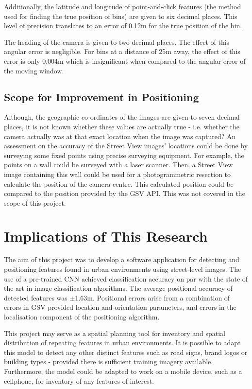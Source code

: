 Additionally, the latitude and longitude of point-and-click features (the method used for finding the true position of bins) are given to six decimal places. This level of precision translates to an error of 0.12m for the true position of the bin.

The heading of the camera is given to two decimal places. The effect of this angular error is negligible. For bins at a distance of 25m away, the effect of this error is only 0.004m which is insignificant when compared to the angular error of the moving window.

\subsection{Scope for Improvement in Positioning}
Although, the geographic co-ordinates of the images are given to seven decimal places, it is not known whether these values are actually true - i.e. whether the camera actually was at that exact location when the image was captured? An assessment on the accuracy of the Street View images' locations could be done by surveying some fixed points using precise surveying equipment. For example, the points on a wall could be surveyed with a laser scanner. Then, a Street View image containing this wall could be used for a photogrammetric resection to calculate the position of the camera centre. This calculated position could be compared to the position provided by the GSV API. This was not covered in the scope of this project.

\section{Implications of This Research}
The aim of this project was to develop a software application for detecting and positioning features found in urban environments using street-level images. The use of a pre-trained CNN achieved classification accuracy on par with the state of the art in image classification algorithms. The average positional accuracy of detected features was $\pm$1.63m. Positional errors arise from a combination of errors in GSV-provided location and orientation parameters, and errors in the localisation component of the positioning algorithm.

This project may serve as a spatial planning tool for inventory and spatial distribution of repeating features in urban environments. It is possible to adapt this model to detect any other distinct features such as road signs, brand logos or building types - provided there is sufficient training imagery available. Furthermore, the model could be adapted to work on a mobile device, such as a cellphone, for inventory of any features of interest.

